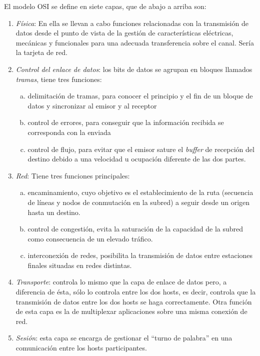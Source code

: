 \documentclass[10pt,a4paper,spanish]{report}
\begin{document}
El modelo OSI se define en siete capas, que de abajo a arriba son:
\begin{enumerate}[\color{tema1}{$\bigstar$}]
  \item \textit{\textcolor{tema1}{Física}}: En ella se llevan a cabo funciones relacionadas con la transmisión de datos desde el punto de vista de la gestión de características eléctricas, mecánicas y funcionales para una adecuada transferencia sobre el canal. Sería la tarjeta de red.
  \item \textit{\textcolor{tema1}{Control del enlace de datos}}: los bits de datos se agrupan en bloques llamados \textit{\textcolor{tema1}{tramas}}, tiene tres funciones:
  \begin{enumerate}[(a)]
    \item delimitación de tramas, para conocer el principio y el fin de un bloque de datos y sincronizar al emisor y al receptor
    \item control de errores, para conseguir que la información recibida se corresponda con la enviada
    \item control de flujo, para evitar que el emisor sature el \textit{\textcolor{tema1}{buffer}} de recepción del destino debido a una velocidad u ocupación diferente de las dos partes.
  \end{enumerate}
  \item \textit{\textcolor{tema1}{Red}}: Tiene tres funciones principales:
  \begin{enumerate}[(a)]
    \item encaminamiento, cuyo objetivo es el establecimiento de la ruta (secuencia de líneas y nodos de conmutación en la subred) a seguir desde un origen hasta un destino.
    \item control de congestión, evita la saturación de la capacidad de la subred como consecuencia de un elevado tráfico. 
    \item interconexión de redes, posibilita la transmisión de datos entre estaciones finales situadas en redes distintas.
  \end{enumerate}
  \item \textit{\textcolor{tema1}{Transporte}}: controla lo mismo que la capa de enlace de datos pero, a diferencia de ésta, sólo lo controla entre los dos hosts, es decir, controla que la transmisión de datos entre los dos hosts se haga correctamente. Otra función de esta capa es la de multiplexar aplicaciones sobre una misma conexión de red.

  \item \textit{\textcolor{tema1}{Sesión}}: esta capa se encarga de gestionar el ``turno de palabra'' en una comunicación entre los hosts participantes.


\end{enumerate}
\end{document}
